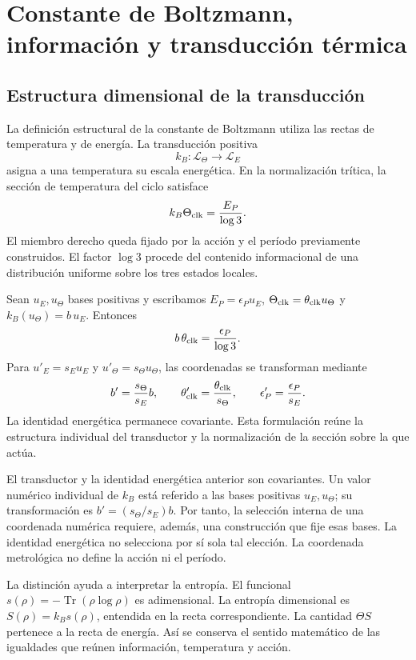 \section{Constante de Boltzmann, información y transducción térmica}
\label{sec:ii-boltzmann}

\subsection{Estructura dimensional de la transducción}

La definición estructural de la constante de Boltzmann utiliza las
rectas de temperatura y de energía. La transducción positiva
\[
 k_B:\mathcal L_\Theta\longrightarrow\mathcal L_E
\]
asigna a una temperatura su escala energética. En la normalización
trítica, la sección de temperatura del ciclo satisface
\[
 k_B\Theta_{\rm clk}=\frac{E_P}{\log3}.
\]
El miembro derecho queda fijado por la acción y el período previamente
construidos. El factor \(\log3\) procede del contenido informacional
de una distribución uniforme sobre los tres estados locales.

Sean \(u_E,u_\Theta\) bases positivas y escribamos
\(E_P=\epsilon_Pu_E\), \(\Theta_{\rm clk}=\theta_{\rm clk}u_\Theta\)
y \(k_B(u_\Theta)=b\,u_E\). Entonces
\[
 b\,\theta_{\rm clk}=\frac{\epsilon_P}{\log3}.
\]
Para \(u'_E=s_Eu_E\) y \(u'_\Theta=s_\Theta u_\Theta\),
las coordenadas se transforman mediante
\[
 b'=\frac{s_\Theta}{s_E}b,\qquad
 \theta'_{\rm clk}=\frac{\theta_{\rm clk}}{s_\Theta},\qquad
 \epsilon'_P=\frac{\epsilon_P}{s_E}.
\]
La identidad energética permanece covariante. Esta formulación reúne
la estructura individual del transductor y la normalización de la
sección sobre la que actúa.

\begin{remark}
El transductor y la identidad energética anterior son covariantes.
Un valor numérico individual de \(k_B\) está referido a las bases positivas
\(u_E,u_\Theta\); su transformación es \(b'=(s_\Theta/s_E)b\).
Por tanto, la selección interna de una coordenada numérica requiere,
además, una construcción que fije esas bases. La identidad energética
no selecciona por sí sola tal elección. La coordenada metrológica
no define la acción ni el período.
\end{remark}

La distinción ayuda a interpretar la entropía. El funcional
\(s(\rho)=-\operatorname{Tr}(\rho\log\rho)\) es adimensional.
La entropía dimensional es \(S(\rho)=k_Bs(\rho)\), entendida en
la recta correspondiente. La cantidad \(\Theta S\) pertenece a
la recta de energía. Así se conserva el sentido matemático de las
igualdades que reúnen información, temperatura y acción.

